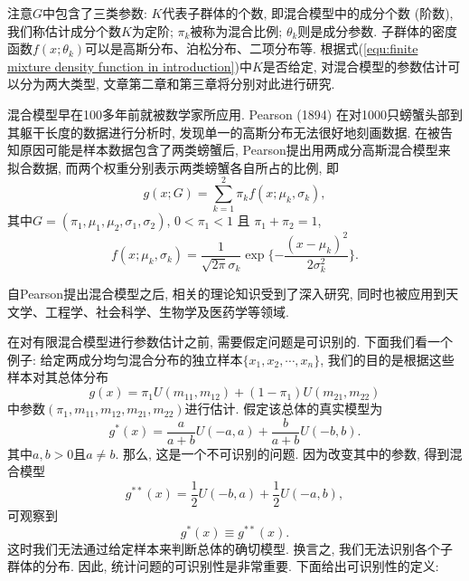 \documentclass[a4paper,12pt,openany,oneside,utf-8]{ctexbook}
\begin{document}
注意$G$中包含了三类参数: $K$代表子群体的个数, 即混合模型中的成分个数 (阶数), 我们称估计成分个数$K$为定阶; $\pi_{k}$被称为混合比例; $\theta_{k}$则是成分参数. 子群体的密度函数$f(x; \theta_{k})$可以是高斯分布、泊松分布、二项分布等. 根据式(\ref{equ:finite mixture density function in introduction})中$K$是否给定, 对混合模型的参数估计可以分为两大类型, 文章第二章和第三章将分别对此进行研究.

混合模型早在100多年前就被数学家所应用. Pearson (1894) 在对1000只螃蟹头部到其躯干长度的数据进行分析时, 发现单一的高斯分布无法很好地刻画数据. 在被告知原因可能是样本数据包含了两类螃蟹后, Pearson提出用两成分高斯混合模型来拟合数据, 而两个权重分别表示两类螃蟹各自所占的比例, 即
\begin{equation*}
  g(x; G)=\sum_{k=1}^{2}\pi_{k}f(x; \mu_{k}, \sigma_{k}),
\end{equation*}
其中$G=(\pi_{1}, \mu_{1}, \mu_{2}, \sigma_{1}, \sigma_{2})$, $0<\pi_{1}<1$ 且 $\pi_{1}+\pi_{2}=1$,
\begin{equation*}
  f(x; \mu_{k}, \sigma_{k})=\frac{1}{\sqrt{2\pi}\sigma_{k}} \exp\{-\frac{(x-\mu_{k})^2}{2\sigma_{k}^2}\}.
\end{equation*}

自Pearson提出混合模型之后, 相关的理论知识受到了深入研究, 同时也被应用到天文学、工程学、社会科学、生物学及医药学等领域.

在对有限混合模型进行参数估计之前, 需要假定问题是可识别的. 下面我们看一个例子: 给定两成分均匀混合分布的独立样本$\{x_1, x_2, \cdots, x_n\}$, 我们的目的是根据这些样本对其总体分布
\begin{equation*}
  g(x)=\pi_{1}U(m_{11}, m_{12})+(1-\pi_{1})U(m_{21}, m_{22})
\end{equation*}
中参数$(\pi_{1}, m_{11}, m_{12}, m_{21}, m_{22})$进行估计. 假定该总体的真实模型为
\begin{equation*}
  g^{*}(x)=\frac{a}{a+b}U(-a, a)+\frac{b}{a+b}U(-b, b).
\end{equation*}
其中$a, b>0$且$a \neq b$. 那么, 这是一个不可识别的问题. 因为改变其中的参数, 得到混合模型
\begin{equation*}
  g^{**}(x)=\frac{1}{2}U(-b, a)+\frac{1}{2}U(-a, b),
\end{equation*}
可观察到
\begin{equation*}
  g^{*}(x) \equiv g^{**}(x).
\end{equation*}
这时我们无法通过给定样本来判断总体的确切模型. 换言之, 我们无法识别各个子群体的分布. 因此, 统计问题的可识别性是非常重要. 下面给出可识别性的定义:
\end{document}
